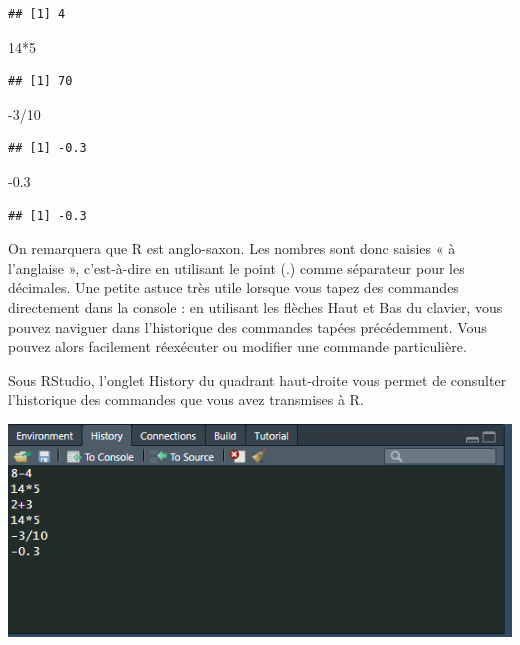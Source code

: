 \documentclass[
]{book}
\newenvironment{Shaded}{\begin{snugshade}}{\end{snugshade}}
\newcommand{\DecValTok}[1]{\textcolor[rgb]{0.00,0.00,0.81}{#1}}
\newcommand{\FloatTok}[1]{\textcolor[rgb]{0.00,0.00,0.81}{#1}}
\newcommand{\SpecialCharTok}[1]{\textcolor[rgb]{0.00,0.00,0.00}{#1}}
\begin{document}
\begin{verbatim}
## [1] 4
\end{verbatim}

\begin{Shaded}
\begin{Highlighting}[]
\DecValTok{14}\SpecialCharTok{*}\DecValTok{5}
\end{Highlighting}
\end{Shaded}

\begin{verbatim}
## [1] 70
\end{verbatim}

\begin{Shaded}
\begin{Highlighting}[]
\SpecialCharTok{{-}}\DecValTok{3}\SpecialCharTok{/}\DecValTok{10}
\end{Highlighting}
\end{Shaded}

\begin{verbatim}
## [1] -0.3
\end{verbatim}

\begin{Shaded}
\begin{Highlighting}[]
\SpecialCharTok{{-}}\FloatTok{0.3}
\end{Highlighting}
\end{Shaded}

\begin{verbatim}
## [1] -0.3
\end{verbatim}

On remarquera que R est anglo-saxon. Les nombres sont donc saisies « à l'anglaise », c'est-à-dire en utilisant le point (.) comme séparateur pour les décimales.
Une petite astuce très utile lorsque vous tapez des commandes directement dans la console : en utilisant les flèches Haut et Bas du clavier, vous pouvez naviguer dans l'historique des commandes tapées précédemment. Vous pouvez alors facilement réexécuter ou modifier une commande particulière.

Sous RStudio, l'onglet History du quadrant haut-droite vous permet de consulter l'historique des commandes que vous avez transmises à R.

\includegraphics[width=1\linewidth]{images/history}
\end{document}
